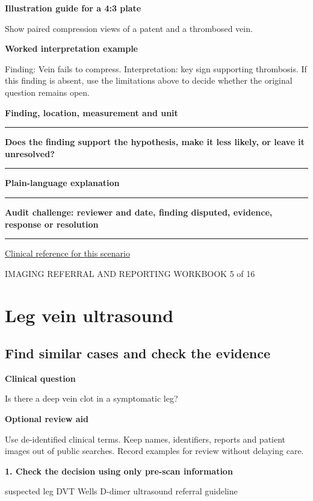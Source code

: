 \documentclass[11pt,a4paper]{article}
\newcommand{\record}[1]{\textbf{#1}\par\vspace{0.55\baselineskip}\hrule\vspace{0.35\baselineskip}}
\begin{document}
\textbf{Illustration guide for a 4:3 plate}\par Show paired compression views of a patent and a thrombosed vein.\par

\textbf{Worked interpretation example}\par Finding: Vein fails to compress. Interpretation: key sign supporting thrombosis. If this finding is absent, use the limitations above to decide whether the original question remains open.\par

\record{Finding, location, measurement and unit}

\record{Does the finding support the hypothesis, make it less likely, or leave it unresolved?}

\record{Plain-language explanation}

\record{Audit challenge: reviewer and date, finding disputed, evidence, response or resolution}

\small\href{https://www.nice.org.uk/guidance/ng158/chapter/Recommendations}{Clinical reference for this scenario}

\normalsize

\newpage

{\small IMAGING REFERRAL AND REPORTING WORKBOOK \hfill 5 of 16}

\section*{Leg vein ultrasound}

\subsection*{Find similar cases and check the evidence}

\textbf{Clinical question}\par Is there a deep vein clot in a symptomatic leg?\par

\textbf{Optional review aid}\par Use de-identified clinical terms. Keep names, identifiers, reports and patient images out of public searches. Record examples for review without delaying care.\par

\textbf{1. Check the decision using only pre-scan information}\par suspected leg DVT Wells D-dimer ultrasound referral guideline\par
\end{document}
